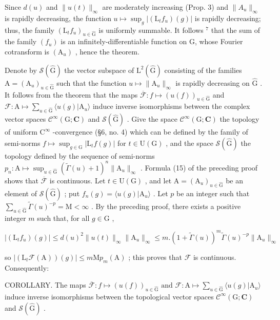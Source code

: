 Since \(d(u)\) and \(\|u(t)\|_{\infty}\) are moderately increasing (Prop. 3) and \(\|A_{u}\|_{\infty}\) is rapidly decreasing, the function \(u \mapsto \sup_{g} |(\mathrm{L}_{t}f_{u})(g)|\) is rapidly decreasing; thus, the family \((\mathrm{L}_{t}f_{u})_{u \in \hat{\mathrm{G}}}\) is uniformly summable. It follows \(^{7}\) that the sum of the family \((f_{u})\) is an infinitely-differentiable function on G, whose Fourier cotransform is \((\mathrm{A}_{u})\) , hence the theorem.

Denote by \(\mathcal{S}(\hat{\mathrm{G}})\) the vector subspace of \(\mathrm{L}^2 (\hat{\mathrm{G}})\) consisting of the families \(\mathrm{A} = (\mathrm{A}_u)_{u\in \hat{\mathrm{G}}}\) such that the function \(u\mapsto \| \mathrm{A}_u\|_\infty\) is rapidly decreasing on \(\hat{\mathrm{G}}\) . It follows from the theorem that the maps \(\overline{\mathcal{F}}:f\mapsto (u(f))_{u\in \hat{\mathrm{G}}}\) and \(\mathcal{F}\colon \mathrm{A}\mapsto \sum_{u\in \hat{\mathrm{G}}}\langle u(g)|\mathrm{A}_u\rangle\) induce inverse isomorphisms between the complex vector spaces \(\mathcal{C}^\infty (\mathrm{G};\mathbf{C})\) and \(\mathcal{S}(\hat{\mathrm{G}})\) . Give the space \(\mathcal{C}^\infty (\mathrm{G};\mathbf{C})\) the topology of uniform \(\mathrm{C}^\infty\) -convergence (§6, no. 4) which can be defined by the family of semi-norms \(f\mapsto \sup_{g\in \mathrm{G}}|\mathrm{L}_t f(g)|\) for \(t\in \mathrm{U}(\mathrm{G})\) , and the space \(\mathcal{S}(\hat{\mathrm{G}})\) the topology defined by the sequence of semi-norms \(p_n:\mathrm{A}\mapsto \sup_{u\in \hat{\mathrm{G}}}(\tilde{\Gamma} (u) + 1)^n\| \mathrm{A}_u\|_\infty\) . Formula (15) of the preceding proof shows that \(\overline{\mathcal{F}}\) is continuous. Let \(t\in \mathrm{U}(\mathrm{G})\) , and let \(\mathrm{A} = (\mathrm{A}_u)_{u\in \hat{\mathrm{G}}}\) be an element of \(\mathcal{S}(\hat{\mathrm{G}})\) ; put \(f_{n}(g) = \langle u(g)|\mathrm{A}_{u}\rangle\) . Let \(p\) be an integer such that \(\sum_{u\in \hat{\mathrm{G}}} \tilde{\Gamma} (u)^{-p} = \mathrm{M} < \infty\) . By the preceding proof, there exists a positive integer \(m\) such that, for all \(g\in \mathrm{G}\) ,

\[
| (\mathrm{L} _ {t} f _ {u}) (g) | \leq d (u) ^ {2} \| u (t) \| _ {\infty} \| \mathrm{A} _ {u} \| _ {\infty} \leq m. (1 + \tilde {\Gamma} (u)) ^ {m} \tilde {\Gamma} (u) ^ {- p} \| \mathrm{A} _ {u} \| _ {\infty}
\]

so \(|(\mathrm{L}_t\mathcal{F}(\mathrm{A}))(g)| \leq m\mathrm{M}p_m(\mathrm{A})\) ; this proves that \(\mathcal{F}\) is continuous. Consequently:

COROLLARY. The maps \(\overline{\mathcal{F}}: f \mapsto (u(f))_{u \in \hat{\mathrm{G}}} \text{ and } \mathcal{F}: \mathrm{A} \mapsto \sum_{u \in \hat{\mathrm{G}}} \langle u(g) | \mathrm{A}_u \rangle\) induce inverse isomorphisms between the topological vector spaces \(\mathcal{C}^\infty(\mathrm{G}; \mathbf{C})\) and \(\mathcal{S}(\hat{\mathrm{G}})\) .

